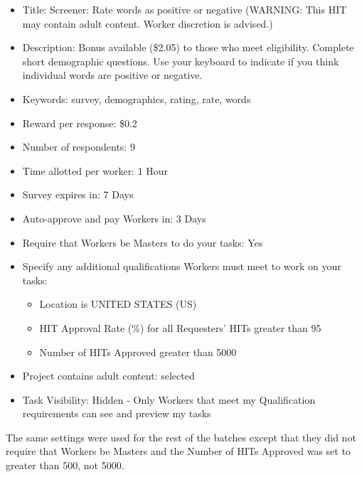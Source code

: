 \documentclass[man]{apa6}
\providecommand{\tightlist}{%
  \setlength{\itemsep}{0pt}\setlength{\parskip}{0pt}}
\begin{document}
\begin{itemize}
\tightlist
\item
  Title: Screener: Rate words as positive or negative (WARNING: This HIT may contain adult content. Worker discretion is advised.)\\
\item
  Description: Bonus available (\$2.05) to those who meet eligibility. Complete short demographic questions. Use your keyboard to indicate if you think individual words are positive or negative.
\item
  Keywords: survey, demographics, rating, rate, words
\item
  Reward per response: \$0.2
\item
  Number of respondents: 9
\item
  Time allotted per worker: 1 Hour
\item
  Survey expires in: 7 Days
\item
  Auto-approve and pay Workers in: 3 Days
\item
  Require that Workers be Masters to do your tasks: Yes
\item
  Specify any additional qualifications Workers must meet to work on your tasks:

  \begin{itemize}
  \tightlist
  \item
    Location is UNITED STATES (US)
  \item
    HIT Approval Rate (\%) for all Requesters' HITs greater than 95
  \item
    Number of HITs Approved greater than 5000
  \end{itemize}
\item
  Project contains adult content: selected
\item
  Task Visibility: Hidden - Only Workers that meet my Qualification requirements can see and preview my tasks
\end{itemize}

The same settings were used for the rest of the batches except that they did not require that Workers be Masters and the Number of HITs Approved was set to greater than 500, not 5000.
\end{document}
